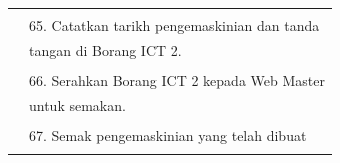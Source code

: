 \documentclass[
]{article}
\begin{document}
\begin{longtable}[]{@{}ll@{}}
\begin{minipage}[t]{0.71\columnwidth}
\strut
\end{minipage}\tabularnewline
\begin{minipage}[t]{0.23\columnwidth}\raggedright
\strut
\end{minipage} & \begin{minipage}[t]{0.71\columnwidth}\raggedright
65. Catatkan tarikh pengemaskinian dan tanda\strut
\end{minipage}\tabularnewline
\begin{minipage}[t]{0.23\columnwidth}\raggedright
\strut
\end{minipage} & \begin{minipage}[t]{0.71\columnwidth}\raggedright
tangan di Borang ICT 2.\strut
\end{minipage}\tabularnewline
\begin{minipage}[t]{0.23\columnwidth}\raggedright
\strut
\end{minipage} & \begin{minipage}[t]{0.71\columnwidth}\raggedright
\strut
\end{minipage}\tabularnewline
\begin{minipage}[t]{0.23\columnwidth}\raggedright
\strut
\end{minipage} & \begin{minipage}[t]{0.71\columnwidth}\raggedright
66. Serahkan Borang ICT 2 kepada Web Master\strut
\end{minipage}\tabularnewline
\begin{minipage}[t]{0.23\columnwidth}\raggedright
\strut
\end{minipage} & \begin{minipage}[t]{0.71\columnwidth}\raggedright
untuk semakan.\strut
\end{minipage}\tabularnewline
\begin{minipage}[t]{0.23\columnwidth}\raggedright
\strut
\end{minipage} & \begin{minipage}[t]{0.71\columnwidth}\raggedright
\strut
\end{minipage}\tabularnewline
\begin{minipage}[t]{0.23\columnwidth}\raggedright
\strut
\end{minipage} & \begin{minipage}[t]{0.71\columnwidth}\raggedright
67. Semak pengemaskinian yang telah dibuat\strut
\end{minipage}\tabularnewline
\begin{minipage}[t]{0.23\columnwidth}\raggedright
\strut
\end{minipage} & \begin{minipage}[t]{0.71\columnwidth}\raggedright

\end{minipage}
\end{longtable}
\end{document}
